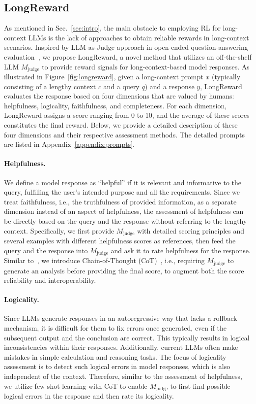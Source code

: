 \subsection{LongReward}
As mentioned in Sec.~\ref{sec:intro}, the main obstacle to employing RL for long-context LLMs is the lack of approaches to obtain reliable rewards in long-context scenarios. 
Inspired by LLM-as-Judge approach in open-ended question-answering evaluation~\cite{mt-bench, alpacaeval2, alignbench}, we propose LongReward, a novel method that utilizes an off-the-shelf LLM $M_\text{judge}$ to provide reward signals for long-context-based model responses. As illustrated in Figure~\ref{fig:longreward}, given a long-context prompt $x$ (typically consisting of a lengthy context $c$ and a query $q$) and a response $y$, LongReward evaluates the response based on four dimensions that are valued by humans: helpfulness, logicality, faithfulness, and completeness. For each dimension, LongReward assigns a score ranging from 0 to 10, and the average of these scores constitutes the final reward. Below, we provide a detailed description of these four dimensions and their respective assessment methods. The detailed prompts are listed in Appendix~\ref{appendix:prompts}.

\paragraph{Helpfulness.}
We define a model response as ``helpful'' if it is relevant and informative to the query, fulfilling the user's intended purpose and all the requirements. Since we treat faithfulness, i.e., the truthfulness of provided information, as a separate dimension instead of an aspect of helpfulness, the assessment of helpfulness can be directly based on the query and the response without referring to the lengthy context. Specifically, we first provide $M_\text{judge}$ with detailed scoring principles and several examples with different helpfulness scores as references, then feed the query and the response into $M_\text{judge}$ and ask it to rate helpfulness for the response. Similar to~\citet{mt-bench}, we introduce Chain-of-Thought (CoT)~\cite{cot}, i.e., requiring $M_\text{judge}$ to generate an analysis before providing the final score, to augment both the score reliability and interoperability.

\paragraph{Logicality.}
Since LLMs generate responses in an autoregressive way that lacks a rollback mechanism, it is difficult for them to fix errors once generated, even if the subsequent output and the conclusion are correct. This typically results in logical inconsistencies within their responses. Additionally, current LLMs often make mistakes in simple calculation and reasoning tasks. The focus of logicality assessment is to detect such logical errors in model responses, which is also independent of the context. Therefore, similar to the assessment of helpfulness, we utilize few-shot learning with CoT to enable $M_\text{judge}$ to first find possible logical errors in the response and then rate its logicality.

